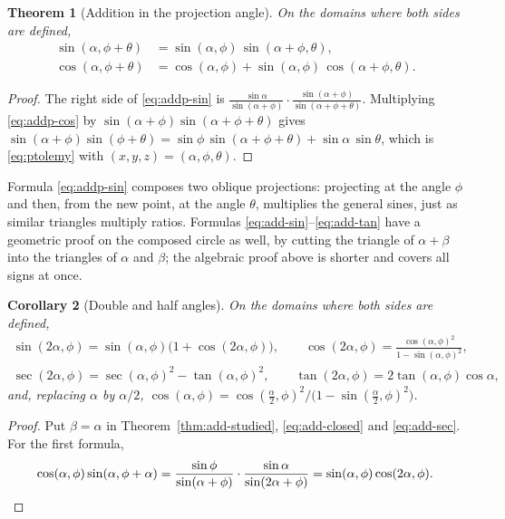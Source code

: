 \documentclass[11pt]{amsart}
\newtheorem{thm}{Theorem}[section]
\newtheorem{cor}[thm]{Corollary}
\theoremstyle{definition}
\theoremstyle{remark}
\numberwithin{equation}{section}
\begin{document}
\begin{thm}[Addition in the projection angle]
\label{thm:add-projection}
On the domains where both sides are defined,
\begin{align}
\label{eq:addp-sin}
\sin(\alpha,\phi+\theta) &= \sin(\alpha,\phi)\,\sin(\alpha+\phi,\theta), \\
\label{eq:addp-cos}
\cos(\alpha,\phi+\theta) &= \cos(\alpha,\phi) + \sin(\alpha,\phi)\,\cos(\alpha+\phi,\theta).
\end{align}
\end{thm}

\begin{proof}
The right side of \eqref{eq:addp-sin} is
$\frac{\sin\alpha}{\sin(\alpha+\phi)}\cdot\frac{\sin(\alpha+\phi)}{\sin(\alpha+\phi+\theta)}$.
Multiplying \eqref{eq:addp-cos} by $\sin(\alpha+\phi)\sin(\alpha+\phi+\theta)$
gives $\sin(\alpha+\phi)\sin(\phi+\theta) = \sin\phi\,\sin(\alpha+\phi+\theta)
+ \sin\alpha\,\sin\theta$, which is \eqref{eq:ptolemy} with
$(x,y,z) = (\alpha,\phi,\theta)$.
\end{proof}

Formula \eqref{eq:addp-sin} composes two oblique projections: projecting
at the angle $\phi$ and then, from the new point, at the angle $\theta$,
multiplies the general sines, just as similar triangles multiply ratios.
Formulas \eqref{eq:add-sin}--\eqref{eq:add-tan} have a geometric proof
on the composed circle as well, by cutting the triangle of
$\alpha+\beta$ into the triangles of $\alpha$ and $\beta$; the algebraic
proof above is shorter and covers all signs at once.

\begin{cor}[Double and half angles]
\label{cor:double}
On the domains where both sides are defined,
\begin{gather*}
\sin(2\alpha,\phi) = \sin(\alpha,\phi)\bigl(1 + \cos(2\alpha,\phi)\bigr), \qquad
\cos(2\alpha,\phi) = \frac{\cos(\alpha,\phi)^2}{1 - \sin(\alpha,\phi)^2}, \\
\sec(2\alpha,\phi) = \sec(\alpha,\phi)^2 - \tan(\alpha,\phi)^2, \qquad
\tan(2\alpha,\phi) = 2\tan(\alpha,\phi)\cos\alpha ,
\end{gather*}
and, replacing $\alpha$ by $\alpha/2$,
$\cos(\alpha,\phi) = \cos(\tfrac{\alpha}{2},\phi)^2\big/\bigl(1 - \sin(\tfrac{\alpha}{2},\phi)^2\bigr)$.
\end{cor}

\begin{proof}
Put $\beta = \alpha$ in Theorem~\ref{thm:add-studied}, \eqref{eq:add-closed}
and \eqref{eq:add-sec}. For the first formula,
\[
\cos(\alpha,\phi)\sin(\alpha,\phi+\alpha)
= \frac{\sin\phi}{\sin(\alpha+\phi)}\cdot\frac{\sin\alpha}{\sin(2\alpha+\phi)}
= \sin(\alpha,\phi)\cos(2\alpha,\phi). \qedhere
\]
\end{proof}
\end{document}
